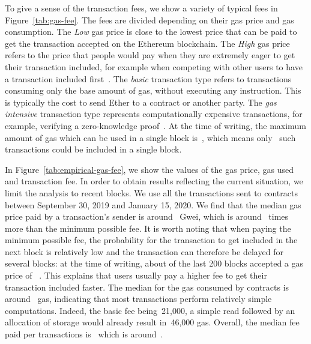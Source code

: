 To give a sense of the transaction fees, we show a variety of typical fees in Figure~\ref{tab:gas-fee}. The fees are divided depending on their gas price and gas consumption. The \textit{Low} gas price is close to the lowest price that can be paid to get the transaction accepted on the Ethereum blockchain. The \textit{High} gas price refers to the price that people would pay when they are extremely eager to get their transaction included, for example when competing with other users to have a transaction included first~\cite{gas-price-history}. The \textit{basic} transaction type refers to transactions consuming only the base amount of gas, without executing any instruction. This is typically the cost to send Ether to a contract or another party. The \textit{gas intensive} transaction type represents computationally expensive transactions, for example, verifying a zero-knowledge proof~\cite{aztec-protocol}. At the time of writing, the maximum amount of gas which can be used in a single block is~, which means only~ such transactions could be included in a single block.

In Figure~\ref{tab:empirical-gas-fee}, we show the values of the gas price, gas used and transaction fee. In order to obtain results reflecting the current situation, we limit the analysis to recent blocks. We use all the transactions sent to contracts between September 30, 2019 and January 15, 2020. We find that the median gas price paid by a transaction's sender is around~ Gwei, which is around~ times more than the minimum possible fee. It is worth noting that when paying the minimum possible fee, the probability for the transaction to get included in the next block is relatively low and the transaction can therefore be delayed for several blocks: at the time of writing, about  of the last 200 blocks accepted a gas price of ~\cite{eth-gas-station}. This explains that users usually pay a higher fee to get their transaction included faster. The median for the gas consumed by contracts is around~ gas, indicating that most transactions perform relatively simple computations. Indeed, the basic fee being~21,000, a simple read followed by an allocation of storage would already result in~46,000 gas. Overall, the median fee paid per transactions is~ which is around~.


